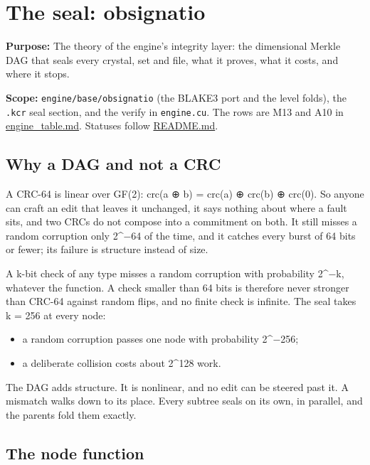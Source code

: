 \chapter{\texorpdfstring{The seal: obsignatio}{The seal: obsignatio}}
\label{chap:obsignatio-seal}

\textbf{Purpose:} The theory of the engine's integrity layer: the dimensional Merkle DAG that seals every crystal, set and file, what it proves, what it costs, and where it stops.

\textbf{Scope:} \texttt{engine/\allowbreak{}base/\allowbreak{}obsignatio} (the BLAKE3 port and the level folds), the \texttt{.\allowbreak{}kcr} seal section, and the verify in \texttt{engine.\allowbreak{}cu}. The rows are M13 and A10 in \hyperref[chap:engine-table]{engine\_\allowbreak{}table.md}. Statuses follow \hyperref[chap:readme]{README.md}.

\section{\texorpdfstring{Why a DAG and not a CRC}{Why a DAG and not a CRC}}

A CRC-64 is linear over GF(2): crc(a ⊕ b) = crc(a) ⊕ crc(b) ⊕ crc(0). So anyone can craft an edit that leaves it unchanged, it says nothing about where a fault sits, and two CRCs do not compose into a commitment on both. It still misses a random corruption only 2\textasciicircum{}−64 of the time, and it catches every burst of 64 bits or fewer; its failure is structure instead of size.

A k-bit check of any type misses a random corruption with probability 2\textasciicircum{}−k, whatever the function. A check smaller than 64 bits is therefore never stronger than CRC-64 against random flips, and no finite check is infinite. The seal takes k = 256 at every node:

\begin{itemize}
\item a random corruption passes one node with probability 2\textasciicircum{}−256;
\item a deliberate collision costs about 2\textasciicircum{}128 work.
\end{itemize}

The DAG adds structure. It is nonlinear, and no edit can be steered past it. A mismatch walks down to its place. Every subtree seals on its own, in parallel, and the parents fold them exactly.

\section{\texorpdfstring{The node function}{The node function}}

